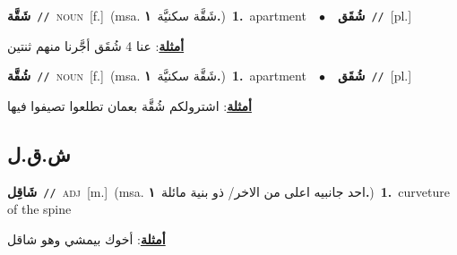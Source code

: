 \documentclass[10pt,a4paper,twoside]{article} %
\begin{document}
\begin{multicols}{2}
{\setlength\topsep{0pt}\textbf{\foreignlanguage{arabic}{شَقَّة}}\ {\color{gray}\texttt{//}\color{black}}\ \textsc{noun}\ [f.]\ \color{gray}(msa. \foreignlanguage{arabic}{شَقَّة سكنيَّة}~\foreignlanguage{arabic}{\textbf{١.}})\color{black}\ \textbf{1.}~apartment\ \ $\bullet$\ \ \setlength\topsep{0pt}\textbf{\foreignlanguage{arabic}{شُقَق}}\ {\color{gray}\texttt{//}\color{black}}\ [pl.]\  \begin{flushright}\color{gray}\foreignlanguage{arabic}{\textbf{\underline{\foreignlanguage{arabic}{أمثلة}}}: عنا 4 شُقَق أجَّرنا منهم ثنتين}\end{flushright}\color{black}} \vspace{2mm}

{\setlength\topsep{0pt}\textbf{\foreignlanguage{arabic}{شُقَّة}}\ {\color{gray}\texttt{//}\color{black}}\ \textsc{noun}\ [f.]\ \color{gray}(msa. \foreignlanguage{arabic}{شَقَّة سكنيَّة}~\foreignlanguage{arabic}{\textbf{١.}})\color{black}\ \textbf{1.}~apartment\ \ $\bullet$\ \ \setlength\topsep{0pt}\textbf{\foreignlanguage{arabic}{شُقَق}}\ {\color{gray}\texttt{//}\color{black}}\ [pl.]\  \begin{flushright}\color{gray}\foreignlanguage{arabic}{\textbf{\underline{\foreignlanguage{arabic}{أمثلة}}}: اشترولكم شُقَّة بعمان تطلعوا تصيفوا فيها}\end{flushright}\color{black}} \vspace{2mm}

\vspace{-3mm}
\subsection*{\color{blue}\foreignlanguage{arabic}{ش.ق.ل}\color{blue}{}} 

{\setlength\topsep{0pt}\textbf{\foreignlanguage{arabic}{شَاقِل}}\ {\color{gray}\texttt{//}\color{black}}\ \textsc{adj}\ [m.]\ \color{gray}(msa. \foreignlanguage{arabic}{احد جانبيه اعلى من الاخر/ ذو بنية مائلة}~\foreignlanguage{arabic}{\textbf{١.}})\color{black}\ \textbf{1.}~curveture of the spine\  \begin{flushright}\color{gray}\foreignlanguage{arabic}{\textbf{\underline{\foreignlanguage{arabic}{أمثلة}}}: أخوك بيمشي وهو شاقل}\end{flushright}\color{black}} \vspace{2mm}


\end{multicols}
\end{document}
